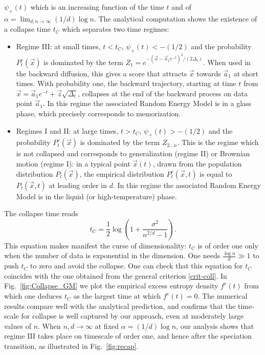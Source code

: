\documentclass[10pt,twocolumn]{article}
\newcommand{\vx}{\vec x}
\newcommand{\va}{\vec a}
\begin{document}
$\psi_+ (t)$ which is an increasing function of the time $t$ and of $\alpha=\lim_{d,n\to\infty} (1/d)\log n$. The analytical computation shows the existence of a collapse time $t_C$ which separates two time regimes:
\begin{itemize}
     \item Regime III: at small  times, $t <t_C$, $\psi_+(t)<-(1/2)$ and the probability $P_t^e(\vx)$ is dominated by the term $Z_1= e^{-(\vx-\va_1 e^{-t})^2/(2\Delta_t)}$. When used in the backward diffusion, this gives a score that attracts $\vx$ towards $\va_1$ at short times. With probability one, the backward trajectory, starting at time $t$ from 
     $\vec x=\vec a_1 e^{-t}+\vec z \sqrt{\Delta_t}$, collapses at the end of the backward process on data point $\va_1$. In this regime the associated Random Energy Model is in a glass phase, which precisely corresponds to  memorization. 
 
     \item Regimes I and II: at large times, $t >t_C$, $\psi_+(t)>-(1/2)$ and the probability $P_t^e(\vx)$ is dominated by the term $Z_{2...n}$.
      This is the regime which is not collapsed and corresponds to generalization (regime II) or Brownian motion (regime I): in a typical point $\vec{x}(t)$, drawn from the population distribution $P_t(\vec{x})$, the empirical distribution $P_t^e(\vec{x},t)$ is equal to $P_t(\vec{x},t)$ at leading order in $d$. 
       In this regime the associated Random Energy Model is in the liquid (or high-temperature) phase. 
\end{itemize}
 The collapse time reads 
\begin{equation} \label{eq:tc_GM}
    t_{C}=\frac{1}{2}\log\left(1+\frac{\sigma^2}{n^{2/d}-1} \right).
\end{equation}
This equation makes manifest the curse of dimensionality: $t_C$ is of order one only when the number of data is exponential in the dimension. One needs $\frac{\log n}{d} \gg 1$ to push $t_C$ to zero and avoid the collapse. 
One can check that this equation for $t_C$ coincides with the one obtained from the general criterion \eqref{crit-coll}.
In Fig.~\ref{fig:Collapse_GM} we plot the empirical excess entropy density $f^e(t)$
from which one deduces $t_C$ as the largest time at which $f^e(t)=0$. 
The numerical results compare well with the analytical prediction, and confirms that the time-scale for collapse is well captured by our approach, even at moderately large values of $n$.
When $n,d \rightarrow \infty$ at fixed $\alpha = (1/d)\log n$, our analysis shows that regime III takes place on timescale of order one, and hence after the speciation transition, as illustrated in Fig.~\ref{fig:recap}.
\end{document}

